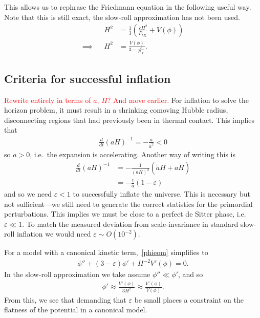 This allows us to rephrase the Friedmann equation in the following useful
way. Note that this is still exact, the slow-roll approximation has
not been used.
\begin{align}
    &&H^2 &= \frac{1}{3}\left(\frac{\varepsilon H^2}{P,_{X}}+V(\phi)\right)\\
    \implies &&  H^2 &= \frac{V(\phi)}{3-\frac{\varepsilon}{P,_{X}}}.
\end{align}

\newpage
    \subsection{Criteria for successful inflation}
    \textcolor{red}{Rewrite entirely in terms of $a$, $H$? And move earlier.}
    For inflation to solve the horizon problem, it must result in a shrinking comoving
    Hubble radius, disconnecting regions that had previously been in thermal contact.
    This implies that
    \begin{align}
        \frac{d}{dt}\left(aH\right)^{-1} = -\frac{\ddot{a}}{\dot{a}^2} < 0
    \end{align}
    so $\ddot{a}>0$, i.e.\ the expansion is accelerating. Another way of writing this is
    \begin{align}
        \frac{d}{dt}\left(aH\right)^{-1} &= -\frac{1}{(aH)^2}\left(\dot{a}H+a\dot{H}\right)\\
            &= -\frac{1}{a}\left(1-\varepsilon\right)
    \end{align}
    and so we need $\varepsilon<1$ to successfully inflate the universe.
    This is necessary but not sufficient---we still need to generate
    the correct statistics for the primordial perturbations.
    This implies we must be close to a perfect de Sitter phase, i.e.\ $\varepsilon\ll1$.
    To match the measured deviation from scale-invariance in standard slow-roll
    inflation we would need $\varepsilon\sim O(10^{-2})$.


For a model with a canonical kinetic term,~\eqref{phieom} simplifies
to
\begin{align}
    \phi''+(3-\varepsilon)\phi'+H^{-2}V'(\phi)=0.
\end{align}
In the slow-roll approximation we take assume $\phi''\ll\phi'$,
and so
\begin{align}
    \phi'\approx\frac{V'(\phi)}{3H^2}\approx\frac{V'(\phi)}{V(\phi)}.
\end{align}
From this, we see that demanding that $\varepsilon$ be small places a constraint
on the flatness of the potential in a canonical model.


